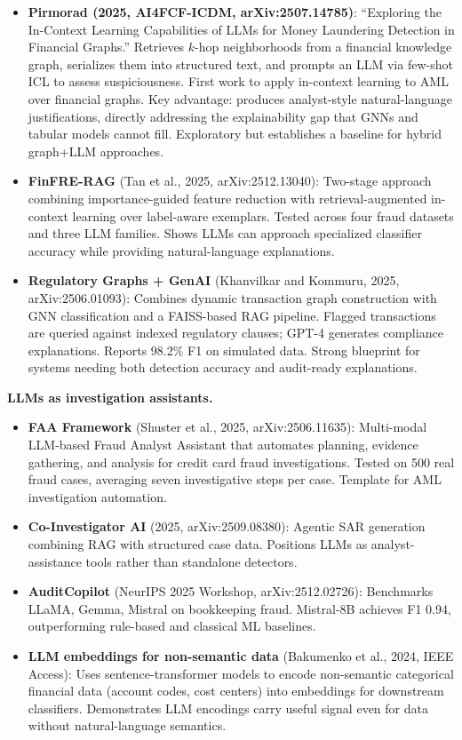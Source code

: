 \documentclass[11pt]{article}
\begin{document}
\begin{itemize}
\item \textbf{Pirmorad (2025, AI4FCF-ICDM, arXiv:2507.14785)}: ``Exploring the In-Context Learning Capabilities of LLMs for Money Laundering Detection in Financial Graphs.'' Retrieves $k$-hop neighborhoods from a financial knowledge graph, serializes them into structured text, and prompts an LLM via few-shot ICL to assess suspiciousness. First work to apply in-context learning to AML over financial graphs. Key advantage: produces analyst-style natural-language justifications, directly addressing the explainability gap that GNNs and tabular models cannot fill. Exploratory but establishes a baseline for hybrid graph+LLM approaches.
\item \textbf{FinFRE-RAG} (Tan et al., 2025, arXiv:2512.13040): Two-stage approach combining importance-guided feature reduction with retrieval-augmented in-context learning over label-aware exemplars. Tested across four fraud datasets and three LLM families. Shows LLMs can approach specialized classifier accuracy while providing natural-language explanations.
\item \textbf{Regulatory Graphs + GenAI} (Khanvilkar and Kommuru, 2025, arXiv:2506.01093): Combines dynamic transaction graph construction with GNN classification and a FAISS-based RAG pipeline. Flagged transactions are queried against indexed regulatory clauses; GPT-4 generates compliance explanations. Reports 98.2\% F1 on simulated data. Strong blueprint for systems needing both detection accuracy and audit-ready explanations.
\end{itemize}

\textbf{LLMs as investigation assistants.}

\begin{itemize}
\item \textbf{FAA Framework} (Shuster et al., 2025, arXiv:2506.11635): Multi-modal LLM-based Fraud Analyst Assistant that automates planning, evidence gathering, and analysis for credit card fraud investigations. Tested on 500 real fraud cases, averaging seven investigative steps per case. Template for AML investigation automation.
\item \textbf{Co-Investigator AI} (2025, arXiv:2509.08380): Agentic SAR generation combining RAG with structured case data. Positions LLMs as analyst-assistance tools rather than standalone detectors.
\item \textbf{AuditCopilot} (NeurIPS 2025 Workshop, arXiv:2512.02726): Benchmarks LLaMA, Gemma, Mistral on bookkeeping fraud. Mistral-8B achieves F1 0.94, outperforming rule-based and classical ML baselines.
\item \textbf{LLM embeddings for non-semantic data} (Bakumenko et al., 2024, IEEE Access): Uses sentence-transformer models to encode non-semantic categorical financial data (account codes, cost centers) into embeddings for downstream classifiers. Demonstrates LLM encodings carry useful signal even for data without natural-language semantics.
\end{itemize}
\end{document}
